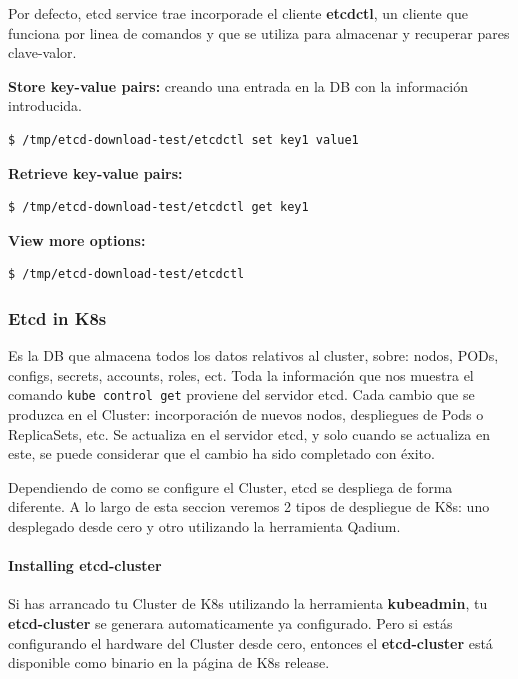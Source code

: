 \documentclass{article}
\newenvironment{codetemplate}[1][]{%
  \mybasecolorbox[#1]
  \itshape
}{%
  \endmybasecolorbox
}
\begin{document}
Por defecto, etcd service trae incorporade el cliente \textbf{etcdctl}, un cliente que funciona por linea de comandos y que se utiliza para almacenar y recuperar pares clave-valor.

\textbf{Store key-value pairs:} creando una entrada en la DB con la información introducida.
\begin{codetemplate}{}
\begin{verbatim}
$ /tmp/etcd-download-test/etcdctl set key1 value1
\end{verbatim}
\end{codetemplate}

\textbf{Retrieve key-value pairs:}
\begin{codetemplate}{}
\begin{verbatim}
$ /tmp/etcd-download-test/etcdctl get key1
\end{verbatim}
\end{codetemplate}

\textbf{View more options:}
\begin{codetemplate}{}
\begin{verbatim}
$ /tmp/etcd-download-test/etcdctl
\end{verbatim}
\end{codetemplate}

\subsubsection{Etcd in K8s}

Es la DB que almacena todos los datos relativos al cluster, sobre: nodos, PODs, configs, secrets, accounts, roles, ect. Toda la información que nos muestra el comando \verb|kube control get| proviene del servidor etcd. Cada cambio que se produzca en el Cluster: incorporación de nuevos nodos, despliegues de Pods o ReplicaSets, etc. Se actualiza en el servidor etcd, y solo cuando se actualiza en este, se puede considerar que el cambio ha sido completado con éxito.

Dependiendo de como se configure el Cluster, etcd se despliega de forma diferente. A lo largo de esta seccion veremos 2 tipos de despliegue de K8s: uno desplegado desde cero y otro utilizando la herramienta Qadium.

\paragraph{Installing etcd-cluster}

Si has arrancado tu Cluster de K8s utilizando la herramienta \textbf{kubeadmin}, tu \textbf{etcd-cluster} se generara automaticamente ya configurado. Pero si estás configurando el hardware del Cluster desde cero, entonces el \textbf{etcd-cluster} está disponible como binario en la página de K8s release.
\end{document}
